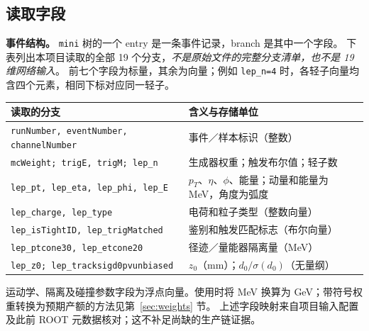 \documentclass[11pt,a4paper,fontset=fandol,scheme=plain]{ctexart}
\begin{document}
\subsection{读取字段}
\textbf{事件结构。} \texttt{mini} 树的一个 entry 是一条事件记录，branch 是其中一个字段。
下表列出本项目读取的全部 19 个分支，\emph{不是原始文件的完整分支清单，也不是 19 维网络输入}。
前七个字段为标量，其余为向量；例如 \texttt{lep\_n=4} 时，各轻子向量均含四个元素，相同下标对应同一轻子。

\begingroup
\small
\renewcommand{\arraystretch}{1.13}
\begin{tabularx}{\linewidth}{@{}p{.62\linewidth}Y@{}}
\toprule
读取的分支 & 含义与存储单位 \\
\midrule
\texttt{runNumber, eventNumber, channelNumber} & 事件／样本标识（整数） \\
\texttt{mcWeight; trigE, trigM; lep\_n} & 生成器权重；触发布尔值；轻子数 \\
\texttt{lep\_pt, lep\_eta, lep\_phi, lep\_E} & $p_T$、$\eta$、$\phi$、能量；动量和能量为 MeV，角度为弧度 \\
\texttt{lep\_charge, lep\_type} & 电荷和粒子类型（整数向量） \\
\texttt{lep\_isTightID, lep\_trigMatched} & 鉴别和触发匹配标志（布尔向量） \\
\texttt{lep\_ptcone30, lep\_etcone20} & 径迹／量能器隔离量（MeV） \\
\texttt{lep\_z0; lep\_tracksigd0pvunbiased} & $z_0$（mm）；$d_0/\sigma(d_0)$（无量纲） \\
\bottomrule
\end{tabularx}
\endgroup

运动学、隔离及碰撞参数字段为浮点向量。使用时将 MeV 换算为 GeV；带符号权重转换为预期产额的方法见第~\ref{sec:weights} 节。
上述字段映射来自项目输入配置及此前 ROOT 元数据核对；这不补足尚缺的生产链证据。
\end{document}
